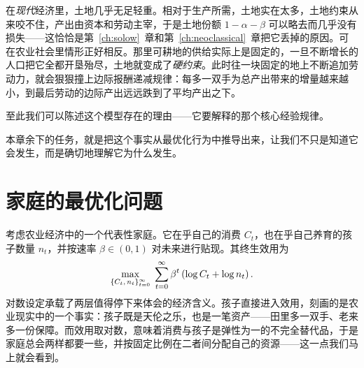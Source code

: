 在\emph{现代}经济里，土地几乎无足轻重。相对于生产所需，土地实在太多，土地约束从来咬不住，产出由资本和劳动主宰，于是土地份额 $1-\alpha-\beta$ 可以略去而几乎没有损失——这恰恰是第~\ref{ch:solow}~章和第~\ref{ch:neoclassical}~章把它丢掉的原因。可在农业社会里情形正好相反。那里可耕地的供给实际上是固定的，一旦不断增长的人口把它全都开垦殆尽，土地就变成了\emph{硬约束}。此时往一块固定的地上不断追加劳动力，就会狠狠撞上边际报酬递减规律：每多一双手为总产出带来的增量越来越小，到最后劳动的边际产出远远跌到了平均产出之下。



至此我们可以陈述这个模型存在的理由——它要解释的那个核心经验规律。


本章余下的任务，就是把这个事实从最优化行为中推导出来，让我们不只是知道它会发生，而是确切地理解它为什么发生。

\section{家庭的最优化问题}

考虑农业经济中的一个代表性家庭。它在乎自己的消费 $C_t$，也在乎自己养育的孩子数量 $n_t$，并按速率 $\beta \in (0,1)$ 对未来进行贴现。其终生效用为
\begin{equation}
\max_{\{C_t,\, n_t\}_{t=0}^{\infty}} \;\sum_{t=0}^{\infty} \beta^{t}\left(\log C_t + \log n_t\right).
\label{eq:malthus-obj}
\end{equation}
对数设定承载了两层值得停下来体会的经济含义。孩子直接进入效用，刻画的是农业现实中的一个事实：孩子既是天伦之乐，也是一笔资产——田里多一双手、老来多一份保障。而效用取对数，意味着消费与孩子是弹性为一的不完全替代品，于是家庭总会两样都要一些，并按固定比例在二者间分配自己的资源——这一点我们马上就会看到。

